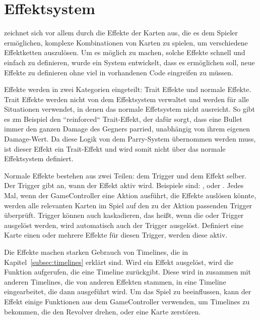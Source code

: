 
\section{Effektsystem}\label{sec:effectsystem}

\renewcommand{\kapitelautor}{Autor: Marvin Kurka}

\FF zeichnet sich vor allem durch die Effekte der Karten aus, die es dem Spieler ermöglichen, komplexe Kombinationen
von Karten zu spielen, um verschiedene Effektketten auszulösen.
Um es möglich zu machen, solche Effekte schnell und einfach zu definieren, wurde ein System entwickelt, dass es
ermöglichen soll, neue Effekte zu definieren ohne viel in vorhandenen Code eingreifen zu müssen.

Effekte werden in zwei Kategorien eingeteilt: Trait Effekte und normale Effekte.
Trait Effekte werden nicht von dem Effektsystem verwaltet und werden für alle Situationen verwendet, in denen das
normale Effetsystem nicht ausreicht.
So gibt es zm Beispiel den ``reinforced`` Trait-Effekt, der dafür sorgt, dass eine Bullet immer den ganzen Damage
des Gegners parried, unabhängig von ihrem eigenen Damage-Wert.
Da diese Logik von dem Parry-System übernommen werden muss, ist dieser Effekt ein Trait-Effekt und wird somit nicht
über das normale Effektsystem definiert.

Normale Effekte bestehen aus zwei Teilen: dem Trigger und dem Effekt selber.
Der Trigger gibt an, wann der Effekt aktiv wird.
Beispiele sind: ,  oder .
Jedes Mal, wenn der GameController eine Aktion ausführt, die Effekte auslösen könnte, werden alle relevanten Karten
im Spiel auf den zu der Aktion passenden Trigger überprüft.
Trigger können auch kaskadieren, das heißt, wenn \zB die  oder 
Trigger ausgelöst werden, wird automatisch auch der  Trigger ausgelöst.
Definiert eine Karte einen oder mehrere Effekte für diesen Trigger, werden diese aktiv.

Die Effekte machen starken Gebrauch von Timelines, die in Kapitel~\ref{subsec:timelines} erklärt sind.
Wird ein Effekt ausgelöst, wird die  Funktion aufgerufen, die eine Timeline zurückgibt.
Diese wird in zusammen mit anderen Timelines, die \zB von anderen Effekten stammen, in eine Timeline eingearbeitet,
die dann ausgeführt wird.
Um das Spiel zu beeinflussen, kann der Effekt einige Funktionen aus dem GameController verwenden, um Timelines
zu bekommen, die \zB den Revolver drehen, oder eine Karte zerstören.

